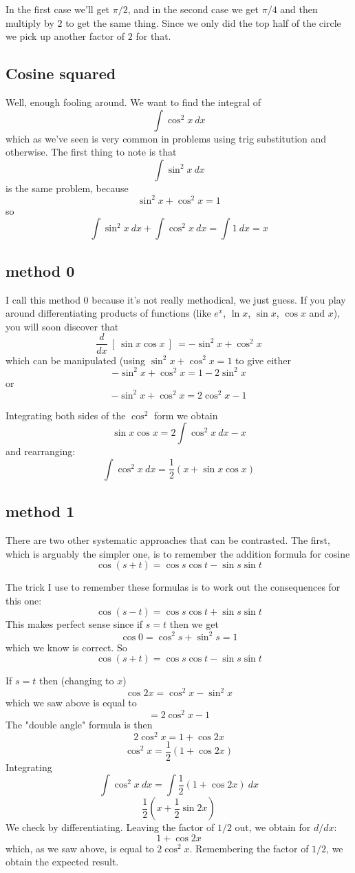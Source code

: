 \documentclass[11pt, oneside]{article}
\begin{document}
In the first case we'll get $\pi/2$, and in the second case we get $\pi/4$ and then multiply by $2$ to get the same thing.  Since we only did the top half of the circle we pick up another factor of $2$ for that.

\subsection*{Cosine squared}
Well, enough fooling around.  We want to find the integral of
\[ \int \cos^2 x \ dx \]
which as we've seen is very common in problems using trig substitution and otherwise.  The first thing to note is that 
\[ \int \sin^2 x \ dx \]
is the same problem, because
\[ \sin^2 x + \cos^2 x = 1 \]
so 
\[ \int \sin^2 x \ dx + \int \cos^2 x  \ dx = \int 1 \ dx = x \]

\subsection*{method 0}
I call this method 0 because it's not really methodical, we just guess.  If you play around differentiating products of functions (like $e^x$, $\ln x$, $\sin x$, $\cos x$ and $x$), you will soon discover that
\[ \frac{d}{dx} \ [ \ \sin x \cos x \ ] \ = -\sin^2 x + \cos^2 x \]
which can be manipulated (using $\sin^2 x + \cos^2 x = 1$ to give either
\[ -\sin^2 x + \cos^2 x = 1- 2 \sin^2 x \]
or
\[ -\sin^2 x + \cos^2 x = 2 \cos^2 x - 1 \]

Integrating both sides of the $\cos^2$ form we obtain
\[ \sin x \cos x = 2 \int \cos^2 x \ dx - x \]
and rearranging:
\[ \int \cos^2 x \ dx = \frac{1}{2} (x + \sin x \cos x) \]

\subsection*{method 1}
There are two other systematic approaches that can be contrasted.  The first, which is arguably the simpler one, is to remember the addition formula for cosine
\[ \cos (s+t) = \cos s \cos t - \sin s \sin t \]

The trick I use to remember these formulas is to work out the consequences for this one:
\[ \cos (s-t) = \cos s \cos t + \sin s \sin t \]
This makes perfect sense since if $s=t$ then we get
\[ \cos 0 = \cos^2 s + \sin^2 s = 1 \]
which we know is correct.  So
\[ \cos (s+t) = \cos s \cos t - \sin s \sin t \]

If $s=t$ then (changing to $x$)
\[ \cos 2x = \cos^2 x  - \sin^2 x \]
which we saw above is equal to
\[ = 2\cos^2 x - 1 \]
The "double angle" formula is then
\[ 2 \cos^2 x = 1 + \cos 2 x \]
\[ \cos^2 x= \frac{1}{2} ( 1 + \cos 2x )  \]
Integrating
\[ \int \cos^2 x \ dx = \int \frac{1}{2} ( 1 + \cos 2x ) \ dx \]
\[ \frac{1}{2} ( x + \frac{1}{2} \sin 2x ) \]
We check by differentiating.  Leaving the factor of $1/2$ out, we obtain for $d/dx$:
\[ 1 + \cos 2x \]
which, as we saw above, is equal to $2 \cos^2 x$.  Remembering the factor of $1/2$, we obtain the expected result.
\end{document}
